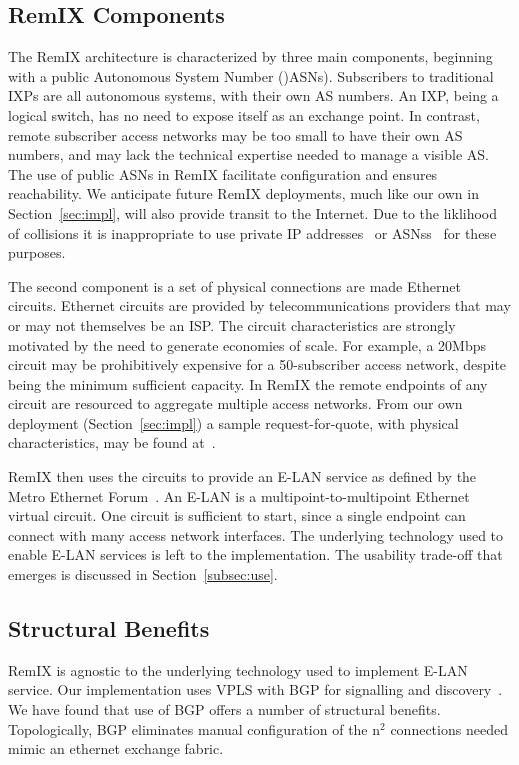 \subsection{RemIX Components}

The RemIX architecture is characterized by three main components, beginning with
a public Autonomous System Number ()\acp{ASN}). Subscribers to traditional IXPs
are all autonomous systems, with their own AS numbers. An IXP, being a logical
switch, has no need to expose itself as an exchange point. In contrast, remote
subscriber access networks may be too small to have their own AS numbers, and
may lack the technical expertise needed to manage a visible AS. The use of
public ASNs in RemIX facilitate configuration and ensures reachability. We
anticipate future RemIX deployments, much like our own in
Section~\ref{sec:impl}, will also provide transit to the Internet. Due to the
liklihood of collisions it is inappropriate to use private IP
addresses~\cite{rfc1918} or \acp{ASN}s~\cite{rfc6996} for these purposes.

The second component is a set of physical connections are made Ethernet
circuits. Ethernet circuits are provided by telecommunications providers that
may or may not themselves be an ISP. The circuit characteristics are strongly
motivated by the need to generate economies of scale. For example, a 20Mbps
circuit may be prohibitively expensive for a 50-subscriber access network,
despite being the minimum sufficient capacity. In RemIX the remote endpoints of
any circuit are resourced to aggregate multiple access networks. From our own
deployment (Section~\ref{sec:impl}) a sample request-for-quote, with physical
characteristics, may be found at~\cite{rfq}.

RemIX then uses the circuits to provide an E-LAN service as defined by the Metro
Ethernet Forum~\cite{mef62}. An E-LAN is a multipoint-to-multipoint Ethernet
virtual circuit. One circuit is sufficient to start, since a single endpoint can
connect with many access network interfaces. The underlying technology used to
enable E-LAN services is left to the implementation. The usability trade-off 
that emerges is discussed in Section~\ref{subsec:use}.

\subsection{Structural Benefits}

RemIX is agnostic to the underlying technology used to implement E-LAN service.
Our implementation uses VPLS with BGP for signalling and
discovery~\cite{vpls-bgp}. We have found that use of BGP offers a number of
structural benefits. Topologically, BGP eliminates manual configuration of the
n$^2$ connections needed mimic an ethernet exchange fabric.

